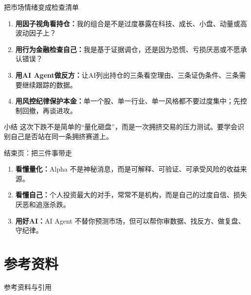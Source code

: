 \documentclass[UTF8,aspectratio=169,11pt]{ctexbeamer}
\begin{document}
\begin{frame}{把市场情绪变成检查清单}
\small
\begin{enumerate}
\item \textbf{用因子视角看持仓：}我的组合是不是过度暴露在科技、成长、小盘、动量或高波动因子上？
\item \textbf{用行为金融检查自己：}我是基于证据调仓，还是因为恐慌、亏损厌恶或不愿承认错误？
\item \textbf{用AI Agent做反方：}让AI列出持仓的三条看空理由、三条证伪条件、三条需要继续跟踪的数据。
\item \textbf{用风控纪律保护本金：}单一个股、单一行业、单一风格都不要过度集中；先控制回撤，再谈进攻。
\end{enumerate}

\vspace{0.25cm}
\begin{keybox}{小结}
这次下跌不是简单的“量化砸盘”，而是一次拥挤交易的压力测试。要学会识别自己是否站在同一条拥挤赛道上。
\end{keybox}

\end{frame}

\begin{frame}{结束页：把三件事带走}
\begin{enumerate}
\item \textbf{看懂量化：}Alpha 不是神秘消息，而是可解释、可验证、可承受风险的收益来源。
\item \textbf{看懂自己：}个人投资最大的对手，常常不是机构，而是自己的过度自信、损失厌恶和追涨杀跌。
\item \textbf{用好AI：}AI Agent 不替你预测市场，但可以帮你审数据、找反方、做复盘、守纪律。
\end{enumerate}
\end{frame}

\section{参考资料}

\begin{frame}[allowframebreaks]{参考资料与引用}
\scriptsize
\nocite{*}


\end{frame}
\end{document}
